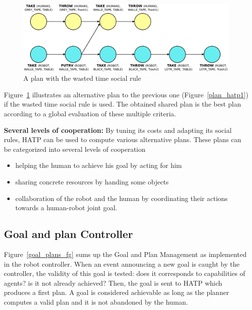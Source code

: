 \documentclass{svmult}
\begin{document}
\begin{figure}[htbp]
  \centering
  \includegraphics[width=0.95\columnwidth]{./figs/second_plan.pdf}
  \caption{A plan with the wasted time social rule}
  \label{plan_hatp2}
\end{figure}

Figure~\ref{plan_hatp2} illustrates an alternative plan to the previous 
one (Figure~\ref{plan_hatp1}) if the wasted time social rule is used.
The obtained shared plan is the best plan according to a global evaluation of
these multiple criteria.

\vspace{0.3cm}
\noindent
\textbf{Several levels of cooperation:} 
By tuning its costs
and adapting its social rules, HATP can be used to compute various
alternative plans. These plans can be categorized into several levels
of cooperation

\begin{itemize}
\item helping the human to achieve his goal by acting for him
\item sharing concrete resources by handing some objects
\item collaboration of the robot and the human by coordinating their
  actions towards a human-robot joint goal.
\end{itemize}

\subsection{ Goal and plan Controller}
Figure~\ref{goal_plans_fg} sums up the Goal and Plan Management as
implemented in the robot controller.  When an event announcing a new
goal is caught by the controller, the validity of this goal is tested:
does it corresponds to capabilities of agents? is it not already
achieved? Then, the goal is sent to HATP which produces a first plan.
A goal is considered achievable as long as the planner computes a
valid plan and it is not abandoned by the human.
\end{document}
